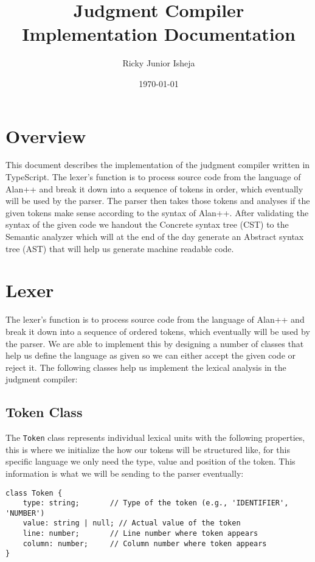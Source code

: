 \documentclass[12pt]{article}
\title{Judgment Compiler Implementation Documentation}
\author{Ricky Junior Isheja}
\date{\today}
\begin{document}
\maketitle
\tableofcontents
\newpage

\section{Overview}
This document describes the implementation of the judgment compiler written in TypeScript. The lexer's function is to process source code from the language of Alan++ and break it down into a sequence of tokens in order, which eventually will be used by the parser. The parser then takes those tokens and analyses if the given tokens make sense according to the syntax of Alan++. After validating the syntax of the given code we handout the Concrete syntax tree (CST) to the Semantic analyzer which will at the end of the day generate  an Abstract syntax tree (AST) that will help us generate machine readable code. 

\section{Lexer}

The lexer's function is to process source code from the language of Alan++ and break it down into a sequence of ordered tokens, which eventually will be used by the parser. We are able to implement this by designing a number of classes that help us define the language as given so we can either accept the given code or reject it. The following classes help us implement the lexical analysis in the judgment compiler:

\subsection{Token Class}
The \texttt{Token} class represents individual lexical units with the following properties, this is where we initialize the how our tokens will be structured like, for this specific language we only need the type, value and position of the token. This information is what we will be sending to the parser eventually:

\begin{lstlisting}
class Token {
    type: string;       // Type of the token (e.g., 'IDENTIFIER', 'NUMBER')
    value: string | null; // Actual value of the token
    line: number;       // Line number where token appears
    column: number;     // Column number where token appears
}
\end{lstlisting}
\end{document}
